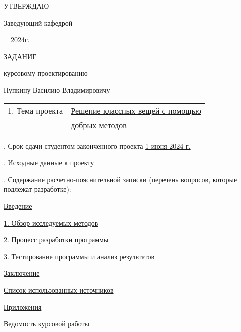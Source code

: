 
\setcounter{page}{2}
% 
\hfill\begin{minipage}{\widthof{Заведующий кафедрой}}


  УТВЕРЖДАЮ

  Заведующий кафедрой


  \underline{\hphantom{хорошая дата }}\ \  2024г.

\end{minipage}
\medskip

\begin{center}
  \noindent
  ЗАДАНИЕ

   курсовому проектированию

  \bigskip
   Пупкину Василию Владимировичу
\end{center}

\noindent
\begin{tabular*}{\linewidth}{@{}ll@{}}
  1. Тема проекта                              & \uline{Решение классных вещей с помощью} \\
  & \uline{добрых методов}
\end{tabular*}

\smallskip
{}. Срок сдачи студентом законченного проекта \uline{\hfill 1 июня 2024 г. \hfill}

\smallskip
{}. Исходные данные к проекту \uline{\hfill}

\smallskip
{}. Содержание расчетно-пояснительной записки (перечень вопросов, которые подлежат разработке):
\begin{description}
  \item \uline{Введение}
  \item \uline{1. Обзор исследуемых методов}
  \item \uline{2. Процесс разработки программы}
  \item \uline{3. Тестирование программы и анализ результатов}
  \item \uline{Заключение}
  \item \uline{Список использованных источников}
  \item \uline{Приложения}
  \item \uline{Ведомость курсовой работы}
\end{description}

